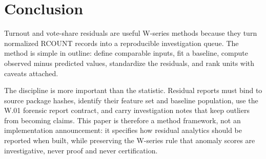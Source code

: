 \section{Conclusion}

Turnout and vote-share residuals are useful W-series methods because they turn
normalized RCOUNT records into a reproducible investigation queue. The method is
simple in outline: define comparable inputs, fit a baseline, compute observed
minus predicted values, standardize the residuals, and rank units with caveats
attached.

The discipline is more important than the statistic. Residual reports must bind
to source package hashes, identify their feature set and baseline population,
use the W.01 forensic report contract, and carry investigation notes that keep
outliers from becoming claims. This paper is therefore a method framework, not
an implementation announcement: it specifies how residual analytics should be
reported when built, while preserving the W-series rule that anomaly scores are
investigative, never proof and never certification.
